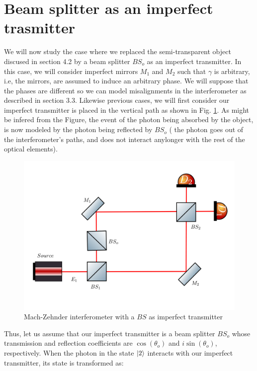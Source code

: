 \documentclass{book}
\begin{document}
\section[BS as an imperfect transmitter]{Beam splitter as an imperfect trasmitter}

We will now study the case where we replaced the semi-transparent object discused in section 4.2 by a beam splitter $BS_{o}$ as an imperfect transmitter. In this case, we will consider imperfect mirrors $M_{1}$ and $M_{2}$ such that $\gamma$ is arbitrary, i.e, the mirrors, are assumed to induce an arbitrary phase. We will suppose that the phases are different so we can model misalignments in the interferometer as described in section 3.3.  Likewise  previous cases, we will first consider our imperfect transmitter is placed in the vertical path as shown in Fig. \ref{bs vertical}. As might be infered from the Figure, the event of the photon being absorbed by the object, is now modeled by the photon being reflected by $BS_{o}$ ( the photon goes out of the interferometer's paths, and does not interact anylonger with the rest of the optical elements).



\begin{figure}[h!]
\centering
\includegraphics[width=\linewidth,height=7.5 cm]{images/machzenhderbs.png}
\caption{Mach-Zehnder interferometer with a $BS$ as imperfect transmitter}
\label{bs vertical}
\end{figure}

Thus, let us assume that our imperfect transmitter is a beam splitter $BS_{o}$ whose transmission and reflection coefficients are $\cos(\theta_{o})$ and $i\sin(\theta_{o})$, respectively. When the photon in the state $\ket{2}$ interacts with our imperfect transmitter, its state is transformed as:
\end{document}
